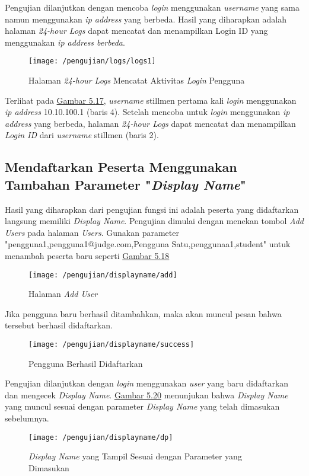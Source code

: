 	Pengujian dilanjutkan dengan mencoba \textit{login} menggunakan \textit{username} yang sama namun menggunakan \textit{ip address} yang berbeda. Hasil yang diharapkan adalah halaman \textit{24-hour Logs} dapat mencatat dan menampilkan Login ID yang menggunakan \textit{ip address berbeda}.
	\begin{figure}[H]
		\centering  
		\texttt{[image: /pengujian/logs/logs1]}  
		\caption[Halaman \textit{24-hour Logs} Mencatat Aktivitas \textit{Login} Pengguna]{Halaman \textit{24-hour Logs} Mencatat Aktivitas \textit{Login} Pengguna} 
		\label{fig:logs1} 
	\end{figure}
	Terlihat pada \hyperref[fig:logs1]{Gambar 5.17}, \textit{username} stillmen pertama kali \textit{login} menggunakan \textit{ip address} 10.10.100.1 (baris 4). Setelah mencoba untuk \textit{login} menggunakan \textit{ip address} yang berbeda, halaman \textit{24-hour Logs} dapat mencatat dan menampilkan \textit{Login ID} dari \textit{username} stillmen (baris 2).
	
	\subsection{Mendaftarkan Peserta Menggunakan Tambahan Parameter "\textit{Display Name}"}
	Hasil yang diharapkan dari pengujian fungsi ini adalah peserta yang didaftarkan langsung memiliki \textit{Display Name}. Pengujian dimulai dengan menekan tombol \textit{Add Users} pada halaman \textit{Users}. Gunakan parameter "pengguna1,pengguna1@judge.com,Pengguna Satu,penggunaa1,student" untuk menambah peserta baru seperti \hyperref[fig:useradd]{Gambar 5.18}
	\begin{figure}[H]
		\centering  
		\texttt{[image: /pengujian/displayname/add]}  
		\caption[Halaman \textit{Add User}]{Halaman \textit{Add User}} 
		\label{fig:useradd} 
	\end{figure}

	Jika pengguna baru berhasil ditambahkan, maka akan muncul pesan bahwa tersebut berhasil didaftarkan.
	\begin{figure}[H]
		\centering  
		\texttt{[image: /pengujian/displayname/success]}  
		\caption[Pengguna Berhasil Didaftarkan]{Pengguna Berhasil Didaftarkan} 
		\label{fig:success} 
	\end{figure}

	Pengujian dilanjutkan dengan \textit{login} menggunakan \textit{user} yang baru didaftarkan dan mengecek \textit{Display Name}. \hyperref[fig:dp]{Gambar 5.20} menunjukan bahwa \textit{Display Name} yang muncul sesuai dengan parameter \textit{Display Name} yang telah dimasukan sebelumnya.
	\begin{figure}[H]
		\centering  
		\texttt{[image: /pengujian/displayname/dp]}  
		\caption[\textit{Display Name} yang Tampil Sesuai dengan Parameter yang Dimasukan]{\textit{Display Name} yang Tampil Sesuai dengan Parameter yang Dimasukan} 
		\label{fig:dp} 
	\end{figure}

